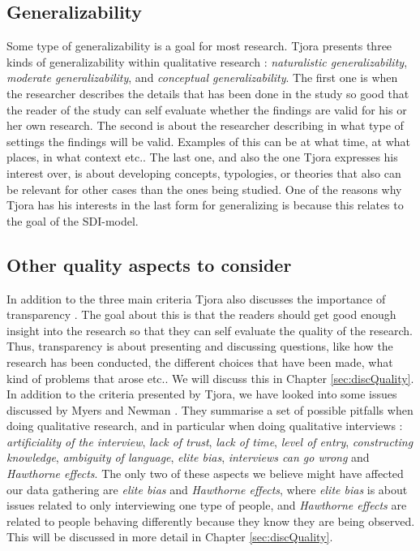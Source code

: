 \subsection{Generalizability}
Some type of generalizability is a goal for most research. Tjora presents three kinds of generalizability within qualitative research \cite{tjora}: \emph{naturalistic generalizability}, \emph{moderate generalizability}, and \emph{conceptual generalizability}. The first one is when the researcher describes the details that has been done in the study so good that the reader of the study can self evaluate whether the findings are valid for his or her own research. The second is about the researcher describing in what type of settings the findings will be valid. Examples of this can be at what time, at what places, in what context etc.. The last one, and also the one Tjora expresses his interest over, is about developing concepts, typologies, or theories that also can be relevant for other cases than the ones being studied. One of the reasons why Tjora has his interests in the last form for generalizing is because this relates to the goal of the SDI-model.

\subsection{Other quality aspects to consider}
\label{sec:otherQualityAspects}
In addition to the three main criteria Tjora also discusses the importance of transparency \cite{tjora}. The goal about this is that the readers should get   good enough insight into the research so that they can self evaluate the quality of the research. Thus, transparency is about presenting and discussing questions, like how the research has been conducted, the different choices that have been made, what kind of problems that arose etc.. We will discuss this in Chapter \ref{sec:discQuality}. In addition to the criteria presented by Tjora, we have looked into some issues discussed by Myers and Newman \cite{interview}. They summarise a set of possible pitfalls when doing qualitative research, and in particular when doing qualitative interviews \cite{interview}: \emph{artificiality of the interview}, \emph{lack of trust}, \emph{lack of time}, \emph{level of entry}, \emph{constructing knowledge}, \emph{ambiguity of language}, \emph{elite bias}, \emph{interviews can go wrong} and \emph{Hawthorne effects}. The only two of these aspects we believe might have affected our data gathering are \emph{elite bias} and \emph{Hawthorne effects}, where \emph{elite bias} is about issues related to only interviewing one type of people, and \emph{Hawthorne effects} are related to people behaving differently because they know they are being observed. This will be discussed in more detail in Chapter \ref{sec:discQuality}.

